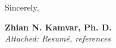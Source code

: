\vspace{2ex}

Sincerely,

\vspace{5ex}

\textbf{Zhian N. Kamvar, Ph. D.}\\
\textit{Attached: Resum\'{e}, references}













\clearpage
